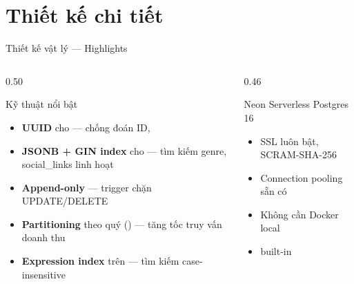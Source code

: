 \section{Thiết kế chi tiết}

\begin{frame}{Thiết kế vật lý --- Highlights}
    \begin{columns}[T]
        \begin{column}{0.50\textwidth}
            \begin{block}{Kỹ thuật nổi bật}
                \begin{itemize}
                    \item<1-> \textbf{UUID} cho 
                          {\scriptsize --- chống đoán ID, }
                    \item<2-> \textbf{JSONB + GIN index} cho 
                          {\scriptsize --- tìm kiếm genre, social\_links linh hoạt}
                    \item<3-> \textbf{Append-only} 
                          {\scriptsize --- trigger chặn UPDATE/DELETE}
                    \item<4-> \textbf{Partitioning} theo quý ()
                          {\scriptsize --- tăng tốc truy vấn doanh thu}
                    \item<5-> \textbf{Expression index} trên 
                          {\scriptsize --- tìm kiếm case-insensitive}
                \end{itemize}
            \end{block}
        \end{column}
        \begin{column}{0.46\textwidth}
            \begin{exampleblock}{Neon Serverless Postgres 16}
                \begin{itemize}\small
                    \item SSL luôn bật, SCRAM-SHA-256
                    \item Connection pooling sẵn có
                    \item Không cần Docker local
                    \item {} built-in
                \end{itemize}
            \end{exampleblock}


\end{column}
\end{columns}
\end{frame}
